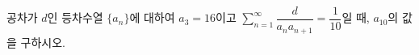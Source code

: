 공차가 $d$인 등차수열 $\{a_n\}$에 대하여 $a_3=16$이고 $\displaystyle\sum_{n=1}^{\infty}\dfrac{d}{a_na_{n+1}}=\dfrac{1}{10}$일 때, $a_{10}$의 값을 구하시오.
